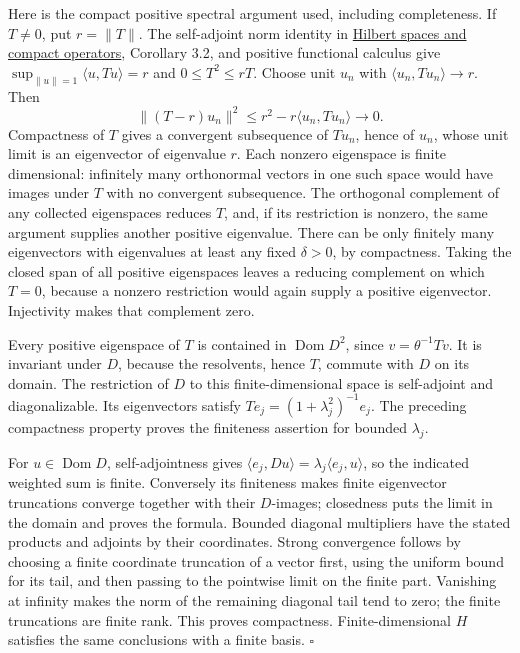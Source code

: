 \documentclass[
  11pt,
]{article}
\begin{document}
Here is the compact positive spectral argument used, including
completeness. If \(T\ne0\), put \(r=\|T\|\). The self-adjoint norm
identity in
\href{https://kokunoyumeto.github.io/open-math-courses/courses/foundations-of-von-neumann-algebras/hilbert-spaces-and-compact-operators.html}{Hilbert
spaces and compact operators}, Corollary 3.2, and positive functional
calculus give \(\sup_{\|u\|=1}\langle u,Tu\rangle=r\) and
\(0\leq T^2\leq rT\). Choose unit \(u_n\) with
\(\langle u_n,Tu_n\rangle\to r\). Then \[
\|(T-r)u_n\|^2
\leq r^2-r\langle u_n,Tu_n\rangle\longrightarrow0.
\] Compactness of \(T\) gives a convergent subsequence of \(Tu_n\),
hence of \(u_n\), whose unit limit is an eigenvector of eigenvalue
\(r\). Each nonzero eigenspace is finite dimensional: infinitely many
orthonormal vectors in one such space would have images under \(T\) with
no convergent subsequence. The orthogonal complement of any collected
eigenspaces reduces \(T\), and, if its restriction is nonzero, the same
argument supplies another positive eigenvalue. There can be only
finitely many eigenvectors with eigenvalues at least any fixed
\(\delta>0\), by compactness. Taking the closed span of all positive
eigenspaces leaves a reducing complement on which \(T=0\), because a
nonzero restriction would again supply a positive eigenvector.
Injectivity makes that complement zero.

Every positive eigenspace of \(T\) is contained in
\(\operatorname{Dom}D^2\), since \(v=\theta^{-1}Tv\). It is invariant
under \(D\), because the resolvents, hence \(T\), commute with \(D\) on
its domain. The restriction of \(D\) to this finite-dimensional space is
self-adjoint and diagonalizable. Its eigenvectors satisfy
\(Te_j=(1+\lambda_j^2)^{-1}e_j\). The preceding compactness property
proves the finiteness assertion for bounded \(\lambda_j\).

For \(u\in\operatorname{Dom}D\), self-adjointness gives
\(\langle e_j,Du\rangle=\lambda_j\langle e_j,u\rangle\), so the
indicated weighted sum is finite. Conversely its finiteness makes finite
eigenvector truncations converge together with their \(D\)-images;
closedness puts the limit in the domain and proves the formula. Bounded
diagonal multipliers have the stated products and adjoints by their
coordinates. Strong convergence follows by choosing a finite coordinate
truncation of a vector first, using the uniform bound for its tail, and
then passing to the pointwise limit on the finite part. Vanishing at
infinity makes the norm of the remaining diagonal tail tend to zero; the
finite truncations are finite rank. This proves compactness.
Finite-dimensional \(H\) satisfies the same conclusions with a finite
basis. \(\square\)
\end{document}
